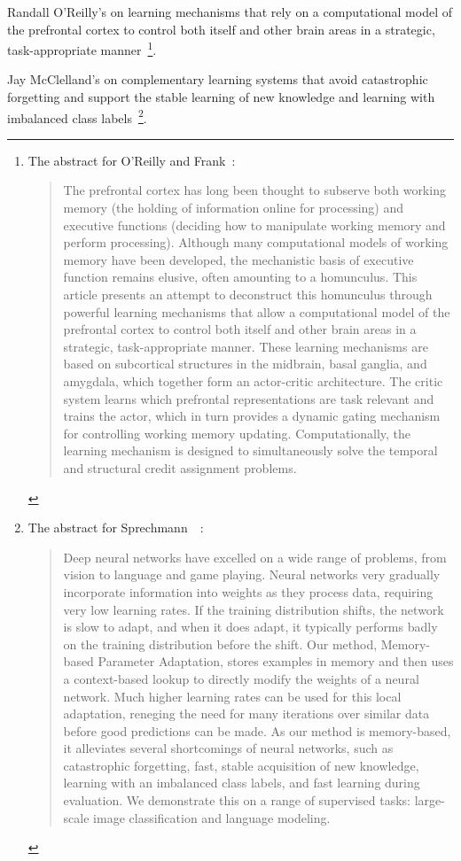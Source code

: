 Randall O'Reilly's {} on learning mechanisms that rely on a computational model of the prefrontal cortex to control both itself and other brain areas in a strategic, task-appropriate manner~\cite{OReillyandFrankNC-06}\footnote{%
%
  The abstract for O'Reilly and Frank~\cite{OReillyandFrankNC-06}:
%
  \begin{quotation}
%
   The prefrontal cortex has long been thought to subserve both working memory (the holding of information online for processing) and executive functions (deciding how to manipulate working memory and perform processing). Although many computational models of working memory have been developed, the mechanistic basis of executive function remains elusive, often amounting to a homunculus. This article presents an attempt to deconstruct this homunculus through powerful learning mechanisms that allow a computational model of the prefrontal cortex to control both itself and other brain areas in a strategic, task-appropriate manner. These learning mechanisms are based on subcortical structures in the midbrain, basal ganglia, and amygdala, which together form an actor-critic architecture. The critic system learns which prefrontal representations are task relevant and trains the actor, which in turn provides a dynamic gating mechanism for controlling working memory updating. Computationally, the learning mechanism is designed to simultaneously solve the temporal and structural credit assignment problems.
%
  \end{quotation}}.

Jay McClelland's {} on complementary learning systems that avoid catastrophic forgetting and support the stable learning of new knowledge and learning with imbalanced class labels~\cite{SprechmannetalICLR-18}\footnote{%
%
  The abstract for Sprechmann~\etal{}~\cite{SprechmannetalICLR-18}:
%
  \begin{quotation}
%
   Deep neural networks have excelled on a wide range of problems, from vision to language and game playing. Neural networks very gradually incorporate information into weights as they process data, requiring very low learning rates. If the training distribution shifts, the network is slow to adapt, and when it does adapt, it typically performs badly on the training distribution before the shift. Our method, Memory-based Parameter Adaptation, stores examples in memory and then uses a context-based lookup to directly modify the weights of a neural network. Much higher learning rates can be used for this local adaptation, reneging the need for many iterations over similar data before good predictions can be made. As our method is memory-based, it alleviates several shortcomings of neural networks, such as catastrophic forgetting, fast, stable acquisition of new knowledge, learning with an imbalanced class labels, and fast learning during evaluation. We demonstrate this on a range of supervised tasks: large-scale image classification and language modeling.
%
  \end{quotation}}.

